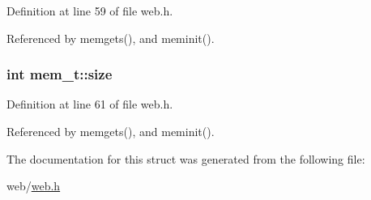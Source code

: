 Definition at line 59 of file web.\+h.



Referenced by memgets(), and meminit().

\subsubsection[{\texorpdfstring{size}{size}}]{\setlength{\rightskip}{0pt plus 5cm}int mem\+\_\+t\+::size}\hypertarget{structmem__t_ab04d46fb2982c9a26a26244286c1b33b}{}\label{structmem__t_ab04d46fb2982c9a26a26244286c1b33b}


Definition at line 61 of file web.\+h.



Referenced by memgets(), and meminit().



The documentation for this struct was generated from the following file\+:\begin{DoxyCompactItemize}
\item 
web/\hyperlink{web_8h}{web.\+h}\end{DoxyCompactItemize}
